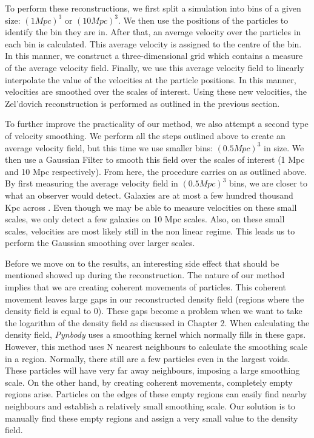 To perform these reconstructions, we first split a simulation into bins of a given size: $(1 Mpc)^3$ or $(10 Mpc)^3$. We then use the positions of the particles to identify the bin they are in. After that, an average velocity over the particles in each bin is calculated. This average velocity is assigned to the centre of the bin. In this manner, we construct a three-dimensional grid which contains a measure of the average velocity field. Finally, we use this average velocity field to linearly interpolate the value of the velocities at the particle positions. In this manner, velocities are smoothed over the scales of interest. Using these new velocities, the Zel'dovich reconstruction is performed as outlined in the previous section.

To further improve the practicality of our method, we also attempt a second type of velocity smoothing. We perform all the steps outlined above to create an average velocity field, but this time we use smaller bins: $(0.5 Mpc)^3$ in size. We then use a Gaussian Filter to smooth this field over the scales of interest (1 Mpc and 10 Mpc respectively). From here, the procedure carries on as outlined above. By first measuring the average velocity field in $(0.5 Mpc)^3$ bins, we are closer to what an observer would detect. Galaxies are at most a few hundred thousand Kpc across . Even though we may be able to measure velocities on these small scales, we only detect a few galaxies on 10 Mpc scales. Also, on these small scales, velocities are most likely still in the non linear regime. This leads us to perform the Gaussian smoothing over larger scales.

Before we move on to the results, an interesting side effect that should be mentioned showed up during the reconstruction. The nature of our method implies that we are creating coherent movements of particles. This coherent movement leaves large gaps in our reconstructed density field (regions where the density field is equal to 0). These gaps become a problem when we want to take the logarithm of the density field as discussed in Chapter 2. When calculating the density field, \textit{Pynbody} uses a smoothing kernel which normally fills in these gaps. However, this method uses N nearest neighbours to calculate the smoothing scale in a region. Normally, there still are a few particles even in the largest voids. These particles will have very far away neighbours, imposing a large smoothing scale. On the other hand, by creating coherent movements, completely empty regions arise. Particles on the edges of these empty regions can easily find nearby neighbours and establish a relatively small smoothing scale. Our solution is to manually find these empty regions and assign a very small value to the density field. 

